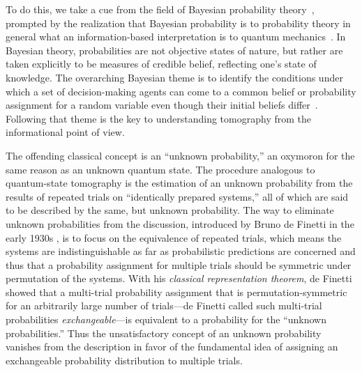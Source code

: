 \documentclass[12pt,aps,eqsecnum]{revtex4-1}
\begin{document}
To do this, we take a cue from the field of Bayesian probability
theory~\cite{Kyburg1980,JaynesPosthumous,Bernardo1994}, prompted
by the realization that Bayesian probability is to probability
theory in general what an information-based interpretation is to
quantum mechanics~\cite{Caves1996,Schack1997}. In Bayesian theory,
probabilities are not objective states of nature, but rather are
taken explicitly to be measures of credible belief, reflecting
one's state of knowledge.  The overarching Bayesian theme is to
identify the conditions under which a set of decision-making
agents can come to a common belief or probability assignment for a
random variable even though their initial beliefs
differ~\cite{Bernardo1994}.  Following that theme is the key to
understanding tomography from the informational point of view.

The offending classical concept is an ``unknown probability,'' an
oxymoron for the same reason as an unknown quantum state.  The
procedure analogous to quantum-state tomography is the estimation of
an unknown probability from the results of repeated trials on
``identically prepared systems,'' all of which are said to be
described by the same, but unknown probability.  The way to
eliminate unknown probabilities from the discussion, introduced by
Bruno de Finetti in the early 1930s
\cite{DeFinetti1990,DeFinettiCollected}, is to focus on the
equivalence of repeated trials, which means the systems are
indistinguishable as far as probabilistic predictions are concerned
and thus that a probability assignment for multiple trials should be
symmetric under permutation of the systems.  With his {\it classical
representation theorem}, de Finetti \cite{DeFinetti1990} showed that
a multi-trial probability assignment that is permutation-symmetric
for an arbitrarily large number of trials---de Finetti called such
multi-trial probabilities {\it exchangeable\/}---is equivalent to a
probability for the ``unknown probabilities.''  Thus the
unsatisfactory concept of an unknown probability vanishes from the
description in favor of the fundamental idea of assigning an
exchangeable probability distribution to multiple trials.
\end{document}
